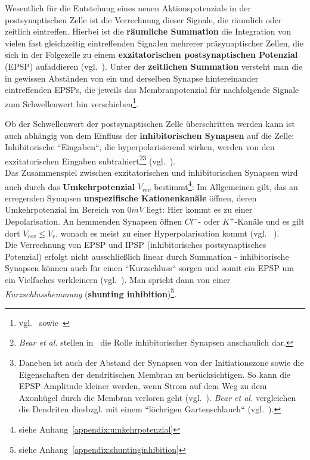 {Wesentlich für die Entstehung eines neuen Aktionspotenzials in der postsynaptischen Zelle ist die Verrechnung dieser Signale, die räumlich oder zeitlich eintreffen.
Hierbei ist die \textbf{räumliche Summation} die Integration von vielen fast gleichzeitig eintreffenden Signalen mehrerer präsynaptischer Zellen, die sich in der Folgezelle zu einem \textbf{exzitatorischen postsynaptischen Potenzial} (EPSP) aufaddieren (vgl.~\cite[101]{HS19a}).
Unter der \textbf{zeitlichen Summation} versteht man die in gewissen Abständen von ein und derselben Synapse hintereinander eintreffenden EPSPs, die jeweils  das Membranpotenzial für nachfolgende Signale zum Schwellenwert hin verschieben\footnote{
    vgl.~\cite[142]{BCP18} sowie~\cite[101]{HS19a}
}.

Ob der Schwellenwert der postsynaptischen Zelle überschritten werden kann ist auch abhängig von dem Einfluss der \textbf{inhibitorischen Synapsen} auf die Zelle: Inhibitorische ``Eingaben``, die hyperpolarisierend wirken, werden von den exzitatorischen Eingaben subtrahiert\footnote{
    \textit{Bear et al.} stellen in~\cite[146, Exkurs 5.6]{BCP18} die Rolle inhibitorischer Synapsen anschaulich dar.}\footnote{Daneben ist auch der Abstand der Synapsen von der Initiationszone sowie die Eigenschaften der dendritischen Membran zu berücksichtigen. So kann die EPSP-Amplitude kleiner werden, wenn Strom auf dem Weg zu dem Axonhügel durch die Membran verloren geht (vgl.~\cite[142 f.]{BCP18}). \textit{Bear et al.} vergleichen die Dendriten diesbzgl. mit einem ``löchrigen Gartenschlauch`` (vgl.~\cite[143]{BCP18}).
} (vgl.~\cite[225]{KSJ+13}).\\


Das Zusammenspiel zwischen exzitatorischen und inhibitorischen Synapsen wird auch durch das \textbf{Umkehrpotenzial} $V_{rev}$ bestimmt\footnote{
    siehe Anhang~\ref{appendix:umkehrpotenzial}
}: Im Allgemeinen gilt, das an erregenden Synapsen \textbf{unspezifische Kationenkanäle} öffnen, deren Umkehrpotenzial im Bereich von $0mV$ liegt: Hier kommt es zu einer Depolarisation. An hemmenden Synapsen öffnen $Cl^-$- oder $K^+$-Kanäle und es gilt dort $V_{rev} \leq V_r$, wonach es meist zu einer Hyperpolarisation kommt (vgl. ~\cite[100]{HS19a}).\\

Die Verrechnung von EPSP und IPSP (inhibitorisches postsynaptisches Potenzial) erfolgt nicht ausschließlich linear durch Summation - inhibitorische Synapsen können auch für einen ``Kurzschluss`` sorgen und somit ein EPSP um ein Vielfaches verkleinern (vgl.~\cite[477]{Sil10}). Man spricht dann von einer \textit{Kurzschlusshemmung} (\textbf{shunting inhibition})\footnote{
    siehe Anhang~\ref{appendix:shuntinginhibition}
}.



}

